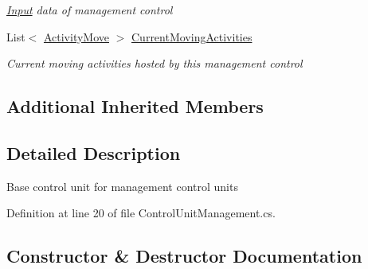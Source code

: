 \begin{DoxyCompactItemize}
\begin{DoxyCompactList}\small\item\em \hyperlink{namespace_general_health_care_elements_1_1_input}{Input} data of management control \end{DoxyCompactList}\item 
List$<$ \hyperlink{class_general_health_care_elements_1_1_activities_1_1_activity_move}{Activity\+Move} $>$ \hyperlink{class_general_health_care_elements_1_1_management_1_1_control_unit_management_ac15d5ab2f2587c9326586aa0ac5312c0}{Current\+Moving\+Activities}
\begin{DoxyCompactList}\small\item\em Current moving activities hosted by this management control \end{DoxyCompactList}\end{DoxyCompactItemize}
\subsection*{Additional Inherited Members}


\subsection{Detailed Description}
Base control unit for management control units 



Definition at line 20 of file Control\+Unit\+Management.\+cs.



\subsection{Constructor \& Destructor Documentation}
